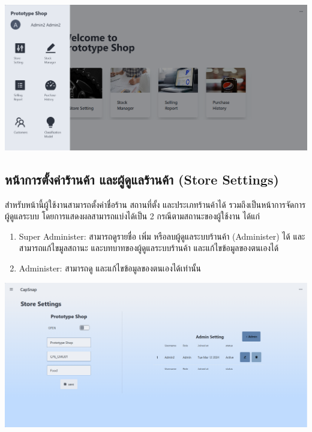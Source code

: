 {
\includegraphics[scale=0.35]{pic/ui/w2.png}
}\\

\subsection{หน้าการตั้งค่าร้านค้า และผู้ดูแลร้านค้า (Store Settings)}
สำหรับหน้านี้ผู้ใช้งานสามารถตั้งค่าชื่อร้าน สถานที่ตั้ง และประเภทร้านค้าได้ รวมถึงเป็นหน้าการจัดการผู้ดูแลระบบ โดยการแสดงผลสามารถแบ่งได้เป็น 2 กรณีตามสถานะของผู้ใช้งาน ได้แก่
\begin{enumerate}
    \item Super Administer: สามารถดูรายชื่อ เพิ่ม หรือลบผู้ดูแลระบบร้านค้า (Administer) ได้ และสามารถแก้ไขมูลสถานะ และบทบาทของผู้ดูแลระบบร้านค้า และแก้ไขข้อมูลของตนเองได้
    \item Administer: สามารถดู และแก้ไขข้อมูลของตนเองได้เท่านั้น
\end{enumerate}
{
\includegraphics[scale=0.35]{pic/ui/w3.png}
}\\

